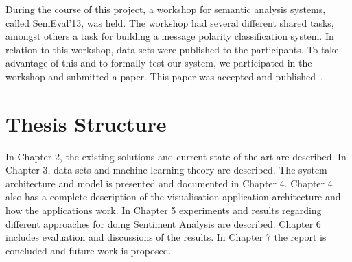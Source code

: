 During the course of this project, a workshop for semantic analysis systems, called SemEval'13, was held. The workshop had several different shared tasks, amongst others a task for building a message polarity classification system. In relation to this workshop, data sets were published to the participants. To take advantage of this and to formally test our system, we participated in the workshop and submitted a paper. This paper was accepted and published~\citep{selmer-EtAl:2013:SemEval-2013}.

\section{Thesis Structure}
\label{sec:structure}

In Chapter 2, the existing solutions and current state-of-the-art are described. In Chapter 3, data sets and machine learning theory are described. The system architecture and model is presented and documented in Chapter 4. Chapter 4 also has a complete description of the visualisation application architecture and how the applications work. In Chapter 5 experiments and results regarding different approaches for doing Sentiment Analysis are described. Chapter 6 includes evaluation and discussions of the results. In Chapter 7 the report is concluded and future work is proposed. 







